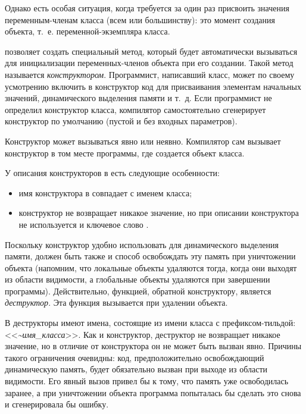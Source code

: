 Однако есть особая ситуация, когда требуется за один раз присвоить значения переменным-членам класса (всем или
большинству):  это момент создания объекта, т.~е. переменной-экземпляра класса. 

 позволяет создать специальный метод, который будет автоматически вызываться для инициализации переменных-членов
объекта при его создании. Такой метод называется
\emph{конструктором}. Программист,
написавший класс, может по своему усмотрению включить в конструктор код для присваивания элементам начальных значений,
динамического выделения памяти и т.~д. Если программист не определил конструктор класса, компилятор самостоятельно
сгенерирует конструктор по умолчанию (пустой и без входных параметров). 

Конструктор может вызываться явно или неявно. Компилятор сам вызывает конструктор в том месте программы, где создается
объект класса. 

У описания конструкторов в  есть следующие особенности:

\begin{itemize}
\item имя конструктора в  совпадает с именем класса;
\item конструктор не возвращает никакое значение, но при описании конструктора не используется и ключевое слово
.
\end{itemize}
Поскольку конструктор удобно использовать для динамического выделения памяти, должен быть также и способ освобождать эту
память при уничтожении объекта (напомним, что локальные объекты удаляются тогда, когда они выходят из области
видимости, а глобальные объекты удаляются при завершении программы). Действительно, функцией, обратной конструктору,
является \emph{деструктор}. Эта функция вызывается при удалении объекта. 

В  деструкторы имеют имена, состоящие из имени класса с префиксом-тильдой: 
<<\emph{\~{}имя\_класса}>>. Как и конструктор, деструктор не возвращает никакое значение, но в
отличие от конструктора он не может быть вызван явно. Причины такого ограничения очевидны: код, предположительно
освобождающий динамическую память, будет обязательно вызван при выходе из области видимости. Его явный вызов привел бы
к тому, что память уже освободилась заранее, а при уничтожении объекта программа попыталась бы сделать это снова и
сгенерировала бы ошибку.

